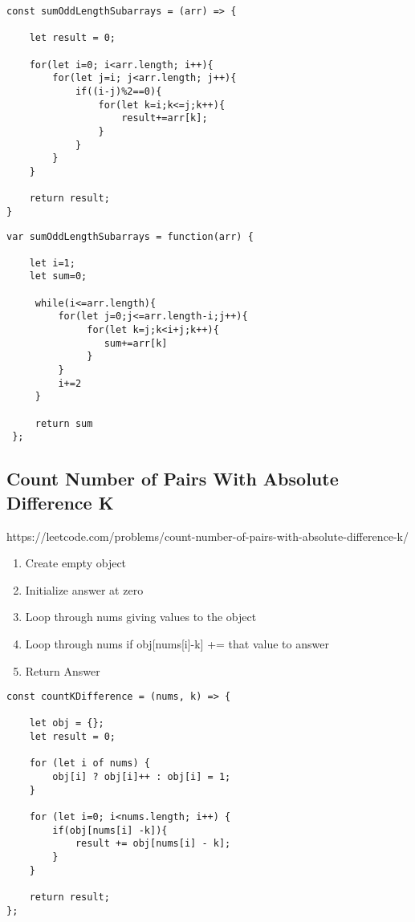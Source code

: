 \documentclass[10pt]{article}
\begin{document}
\begin{lstlisting}[title=Solution sumOddLengthSubarrays with for loops and modulo, captionpos=t]
const sumOddLengthSubarrays = (arr) => {

    let result = 0;

    for(let i=0; i<arr.length; i++){
        for(let j=i; j<arr.length; j++){
            if((i-j)%2==0){
                for(let k=i;k<=j;k++){
                    result+=arr[k];
                }
            }
        }
    }

    return result;
}
\end{lstlisting}

\begin{lstlisting}[title=Solution sumOddLengthSubarrays with while loop, captionpos=t]
var sumOddLengthSubarrays = function(arr) {

    let i=1;
    let sum=0;

     while(i<=arr.length){
         for(let j=0;j<=arr.length-i;j++){
              for(let k=j;k<i+j;k++){
                 sum+=arr[k]
              }
         }
         i+=2
     }
     
     return sum
 };
\end{lstlisting}


\medskip %


\pagebreak %
\medskip 
\subsection{Count Number of Pairs With Absolute Difference K}
https://leetcode.com/problems/count-number-of-pairs-with-absolute-difference-k/

\begin{enumerate}
	\item Create empty object
	\item Initialize answer at zero
	\item Loop through nums giving values to the object
	\item Loop through nums if obj[nums[i]-k] += that value to answer
	\item Return Answer
\end{enumerate}



\begin{lstlisting}[title=Solution countKDifference, captionpos=t]
const countKDifference = (nums, k) => {
    
    let obj = {};
    let result = 0;

    for (let i of nums) {
        obj[i] ? obj[i]++ : obj[i] = 1;
    }
    
    for (let i=0; i<nums.length; i++) {
        if(obj[nums[i] -k]){
            result += obj[nums[i] - k];
        }
    }
    
    return result; 
};
\end{lstlisting}
\medskip %
\end{document}

